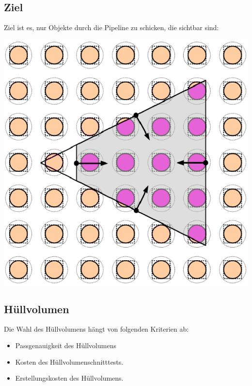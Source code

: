 \documentclass[10pt]{article}
\begin{document}
\subsection{Ziel}
Ziel ist es, nur Objekte durch die Pipeline zu schicken, die sichtbar sind:
\begin{center}
	\includegraphics[scale=0.2]{frustum_culling.png}
\end{center}
\subsection{Hüllvolumen}
Die Wahl des Hüllvolumens hängt von folgenden Kriterien ab:
\begin{itemize}
	\item Passgenauigkeit des Hüllvolumens
	\item Kosten des Hüllvolumenschnitttests. 
	\item Erstellungskosten des Hüllvolumens.
\end{itemize}
\end{document}
